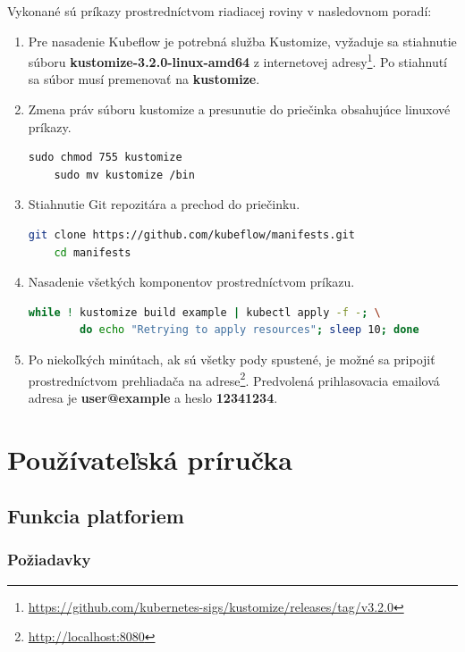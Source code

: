Vykonané sú príkazy prostredníctvom riadiacej roviny v nasledovnom poradí:

\begin{enumerate}
\item{\noindent Pre nasadenie Kubeflow je potrebná služba Kustomize, vyžaduje sa stiahnutie súboru \textbf{kustomize-3.2.0-linux-amd64} z internetovej adresy\footnote{\url{https://github.com/kubernetes-sigs/kustomize/releases/tag/v3.2.0}}. Po stiahnutí sa súbor musí premenovať na \textbf{kustomize}}.
\item{\noindent Zmena práv súboru kustomize a presunutie do priečinka obsahujúce linuxové príkazy.
\begin{lstlisting}[basicstyle=\footnotesize]
    sudo chmod 755 kustomize
    sudo mv kustomize /bin
    \end{lstlisting}}
\item{\noindent Stiahnutie Git repozitára a prechod do priečinku.
\begin{lstlisting}[language=Bash,basicstyle=\footnotesize]
    git clone https://github.com/kubeflow/manifests.git
    cd manifests
    \end{lstlisting}}
\item{\noindent Nasadenie všetkých komponentov prostredníctvom príkazu.
\begin{lstlisting}[language=Bash,basicstyle=\footnotesize]
    while ! kustomize build example | kubectl apply -f -; \
        do echo "Retrying to apply resources"; sleep 10; done
    \end{lstlisting}}
\item{\noindent Po niekoľkých minútach, ak sú všetky pody spustené, je možné sa pripojiť prostredníctvom prehliadača na adrese\footnote{\url{http://localhost:8080}}. Predvolená prihlasovacia emailová adresa je \textbf{user@example} a heslo \textbf{12341234}.}
\end{enumerate}

\chapter{Používateľská príručka}

\section{Funkcia platforiem}
\subsection*{Požiadavky}

